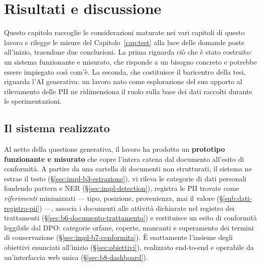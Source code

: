 \chapter{Risultati e discussione}
\label{cap:risultati}

Questo capitolo raccoglie le considerazioni maturate nei vari capitoli di questo lavoro e rilegge le misure del Capitolo~\ref{cap:test} alla luce delle domande poste all'inizio, traendone due conclusioni. La prima riguarda ciò che è stato costruito: un sistema funzionante e misurato, che risponde a un bisogno concreto e potrebbe essere impiegato così com'è. La seconda, che costituisce il baricentro della tesi, riguarda l'AI generativa: un lavoro nato come esplorazione del suo apporto al rilevamento delle PII ne ridimensiona il ruolo sulla base dei dati raccolti durante le sperimentazioni.

\section{Il sistema realizzato}
\label{sec:risultati-sistema}

Al netto della questione generativa, il lavoro ha prodotto un \textbf{prototipo funzionante e misurato} che copre l'intera catena dal documento all'esito di conformità. A partire da una cartella di documenti non strutturati, il sistema ne estrae il testo (§\ref{sec:impl-b3-estrazione}), vi rileva le categorie di dati personali fondendo pattern e NER (§\ref{sec:impl-detection}), registra le PII trovate come \emph{riferimenti} minimizzati --- tipo, posizione, provenienza, mai il valore (§\ref{sub:dati-registro-pii}) ---, associa i documenti alle attività dichiarate nel registro dei trattamenti (§\ref{sec:b6-documento-trattamento}) e restituisce un esito di conformità leggibile dal DPO: categorie orfane, coperte, mancanti e superamento dei termini di conservazione (§\ref{sec:impl-b7-conformita}). È esattamente l'insieme degli obiettivi enunciati all'inizio (§\ref{sec:obiettivi}), realizzato end-to-end e operabile da un'interfaccia web unica (§\ref{sec:b8-dashboard}).

